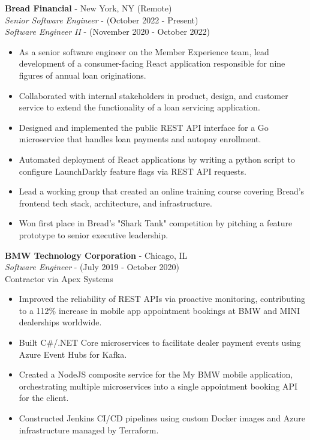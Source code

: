 \documentclass[10pt]{article}
\begin{document}
\begin{paracol}{2}
    \textbf{Bread Financial} - New York, NY (Remote) \\
    \textit{Senior Software Engineer} - {\footnotesize{(October 2022 - Present)}} \\
    \textit{Software Engineer II} - {\footnotesize{(November 2020 - October 2022)}}
    \begin{itemize}
        \item As a senior software engineer on the Member Experience team, lead development of a consumer-facing React application responsible for nine figures of annual loan originations.
        \item Collaborated with internal stakeholders in product, design, and customer service to extend the functionality of a loan servicing application.
        \item Designed and implemented the public REST API interface for a Go microservice that handles loan payments and autopay enrollment.
        \item Automated deployment of React applications by writing a python script to configure LaunchDarkly feature flags via REST API requests.
        \item Lead a working group that created an online training course covering Bread's frontend tech stack, architecture, and infrastructure.
        \item Won first place in Bread's "Shark Tank" competition by pitching a feature prototype to senior executive leadership.
    \end{itemize}

    \noindent \textbf{BMW Technology Corporation} - Chicago, IL \\
    \textit{Software Engineer} - {\footnotesize{(July 2019 - October 2020)}} \\
    {\footnotesize{Contractor via Apex Systems}}
    \begin{itemize}
        \item Improved the reliability of REST APIs via proactive monitoring, contributing to a 112\% increase in mobile app appointment bookings at BMW and MINI dealerships worldwide.
        \item Built C\#/.NET Core microservices to facilitate dealer payment events using Azure Event Hubs for Kafka.
        \item Created a NodeJS composite service for the My BMW mobile application, orchestrating multiple microservices into a single appointment booking API for the client.
        \item Constructed Jenkins CI/CD pipelines using custom Docker images and Azure infrastructure managed by Terraform.
    \end{itemize}



\end{paracol}
\end{document}
